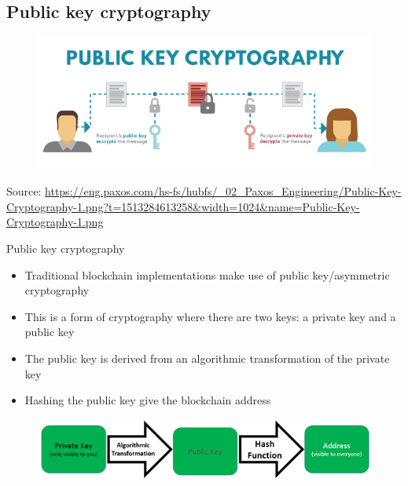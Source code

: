 \documentclass[11pt]{beamer}
\begin{document}

\subsection{Public key cryptography}

\begin{frame}
	\begin{figure}[]
		\centering
		\includegraphics  [width=4.in]{Images/publickey1}
	\end{figure}
	\begin{tiny}
		Source: \href{https://eng.paxos.com/blockchain-separating-hype-from-substance-part-2}{https://eng.paxos.com/hs-fs/hubfs/\_02\_Paxos\_Engineering/Public-Key-Cryptography-1.png?t=1513284613258\&width=1024\&name=Public-Key-Cryptography-1.png}
	\end{tiny}
\end{frame}



\begin{frame}{Public key cryptography}
	\begin{itemize}
		\item Traditional blockchain implementations make use of public key/asymmetric cryptography
		\item This is a form of cryptography where there are two keys: a private key and a public key
		\item The public key is derived from an algorithmic transformation of the private key
		\item Hashing the public key give the blockchain address
	\end{itemize}
	\begin{figure}[]
		\centering
		\includegraphics  [scale=0.3]{Images/keys}
	\end{figure}
\end{frame}
\end{document}
